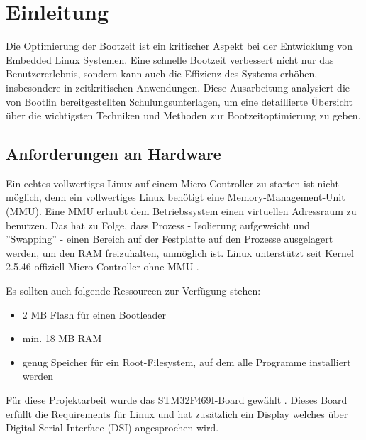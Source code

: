 
\section{Einleitung}
Die Optimierung der Bootzeit ist ein kritischer Aspekt bei der Entwicklung von Embedded Linux Systemen. Eine schnelle Bootzeit verbessert nicht nur das Benutzererlebnis, sondern kann auch die Effizienz des Systems erhöhen, insbesondere in zeitkritischen Anwendungen. Diese Ausarbeitung analysiert die von Bootlin bereitgestellten Schulungsunterlagen, um eine detaillierte Übersicht über die wichtigsten Techniken und Methoden zur Bootzeitoptimierung zu geben.

\subsection{Anforderungen an Hardware}
Ein echtes vollwertiges Linux auf einem Micro-Controller zu starten ist nicht möglich,
denn ein vollwertiges Linux benötigt eine Memory-Management-Unit (MMU). Eine MMU
erlaubt dem Betriebssystem einen virtuellen Adressraum zu benutzen. Das hat zu Folge,
dass Prozess - Isolierung aufgeweicht und ''Swapping'' - einen Bereich auf der
Festplatte auf den Prozesse ausgelagert werden, um den RAM freizuhalten,
unmöglich ist. Linux unterstützt seit Kernel 2.5.46 offiziell Micro-Controller ohne
MMU \cite{uCLinuxWikipedia}.

Es sollten auch folgende Ressourcen zur Verfügung stehen:
\begin{itemize}
	\item 2 MB Flash für einen Bootleader
	\item min. 18 MB RAM
	\item genug Speicher für ein Root-Filesystem, auf dem alle Programme installiert werden
\end{itemize}


Für diese Projektarbeit wurde das STM32F469I-Board gewählt \cite{stmWebsiteBoard}.
Dieses Board erfüllt die Requirements für Linux und hat zusätzlich ein Display welches
über Digital Serial Interface (DSI) angesprochen wird.
